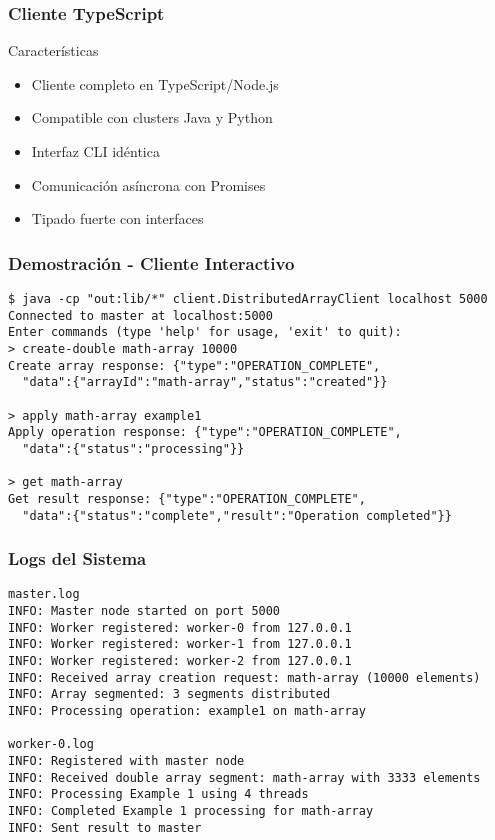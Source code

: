 \documentclass{beamer}
\begin{document}
\begin{frame}[fragile]
\frametitle{Cliente TypeScript}
\begin{block}{Características}
    \begin{itemize}
        \item<1-> Cliente completo en TypeScript/Node.js
        \item<2-> Compatible con clusters Java y Python
        \item<3-> Interfaz CLI idéntica
        \item<4-> Comunicación asíncrona con Promises
        \item<5-> Tipado fuerte con interfaces
    \end{itemize}
\end{block}

\end{frame}

\begin{frame}[fragile]
\frametitle{Demostración - Cliente Interactivo}
\begin{lstlisting}[style=terminal]
$ java -cp "out:lib/*" client.DistributedArrayClient localhost 5000
Connected to master at localhost:5000
Enter commands (type 'help' for usage, 'exit' to quit):
> create-double math-array 10000
Create array response: {"type":"OPERATION_COMPLETE",
  "data":{"arrayId":"math-array","status":"created"}}

> apply math-array example1
Apply operation response: {"type":"OPERATION_COMPLETE",
  "data":{"status":"processing"}}

> get math-array
Get result response: {"type":"OPERATION_COMPLETE",
  "data":{"status":"complete","result":"Operation completed"}}
\end{lstlisting}
\end{frame}

\begin{frame}[fragile]
\frametitle{Logs del Sistema}
\begin{lstlisting}[style=terminal, basicstyle=\tiny\ttfamily\color{terminalwhite}]
master.log
INFO: Master node started on port 5000
INFO: Worker registered: worker-0 from 127.0.0.1
INFO: Worker registered: worker-1 from 127.0.0.1
INFO: Worker registered: worker-2 from 127.0.0.1
INFO: Received array creation request: math-array (10000 elements)
INFO: Array segmented: 3 segments distributed
INFO: Processing operation: example1 on math-array

worker-0.log
INFO: Registered with master node
INFO: Received double array segment: math-array with 3333 elements
INFO: Processing Example 1 using 4 threads
INFO: Completed Example 1 processing for math-array
INFO: Sent result to master
\end{lstlisting}
\end{frame}
\end{document}
